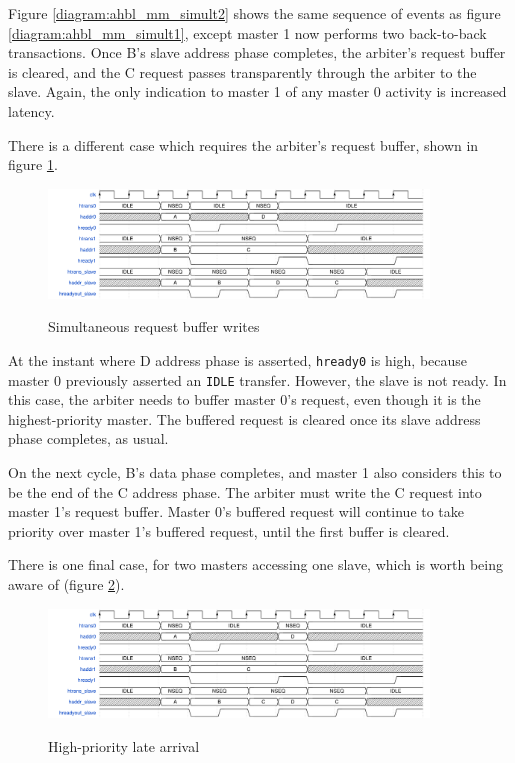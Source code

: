 \documentclass[notitlepage]{article}
\begin{document}
Figure \ref{diagram:ahbl_mm_simult2} shows the same sequence of events as figure \ref{diagram:ahbl_mm_simult1}, except master 1 now performs two back-to-back transactions. Once B's slave address phase completes, the arbiter's request buffer is cleared, and the C request passes transparently through the arbiter to the slave. Again, the only indication to master 1 of any master 0 activity is increased latency.

There is a different case which requires the arbiter's request buffer, shown in figure \ref{diagram:ahbl_mm_simult3}.

\begin{figure}[H]
\centering
\caption{Simultaneous request buffer writes}
\includegraphics[width=0.9\textwidth]{waves/ahbl_mm_simult3.pdf}
\label{diagram:ahbl_mm_simult3}
\end{figure}

At the instant where D address phase is asserted, \texttt{hready0} is high, because master 0 previously asserted an \texttt{IDLE} transfer. However, the slave is not ready. In this case, the arbiter needs to buffer master 0's request, even though it is the highest-priority master. The buffered request is cleared once its slave address phase completes, as usual.

On the next cycle, B's data phase completes, and master 1 also considers this to be the end of the C address phase. The arbiter must write the C request into master 1's request buffer. Master 0's buffered request will continue to take priority over master 1's buffered request, until the first buffer is cleared.

There is one final case, for two masters accessing one slave, which is worth being aware of (figure \ref{diagram:ahbl_mm_latearrival}).

\begin{figure}[H]
\centering
\caption{High-priority late arrival}
\includegraphics[width=0.9\textwidth]{waves/ahbl_mm_latearrival.pdf}
\label{diagram:ahbl_mm_latearrival}
\end{figure}
\end{document}
